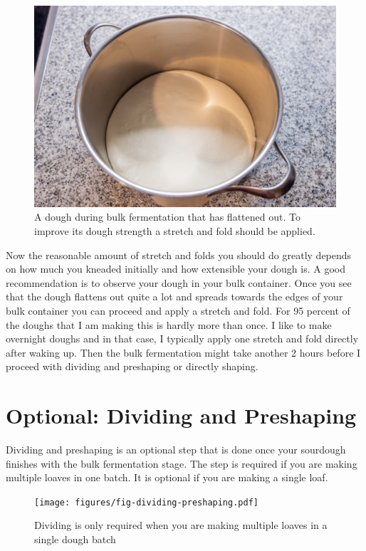 \begin{figure}[!htb]
  \includegraphics[width=\textwidth]{dough-requiring-stretch-and-fold}
  \caption{A dough during bulk fermentation that has flattened out. To improve
  its dough strength a stretch and fold should be applied.}
\end{figure}

Now the reasonable amount of stretch and folds you should do greatly depends on how much you
kneaded initially and how extensible your dough is. A good recommendation is
to observe your dough in your bulk container. Once you see that the dough
flattens out quite a lot and spreads towards the edges of your bulk container
you can proceed and apply a stretch and fold. For 95 percent of the doughs
that I am making this is hardly more than once. I like to make overnight
doughs and in that case, I typically apply one stretch and fold directly after
waking up. Then the bulk fermentation might take another 2 hours before I
proceed with dividing and preshaping or directly shaping.

\section{Optional: Dividing and Preshaping}

Dividing and preshaping is an optional step that is done
once your sourdough finishes with the bulk fermentation stage.
The step is required if you are making multiple loaves in one
batch. It is optional if you are making a single loaf.

\begin{figure}[!htb]
  \texttt{[image: figures/fig-dividing-preshaping.pdf]}
  \caption{Dividing is only required when you are making multiple loaves in a single dough batch}
  \label{fig:dividing-decision-tree}
\end{figure}

